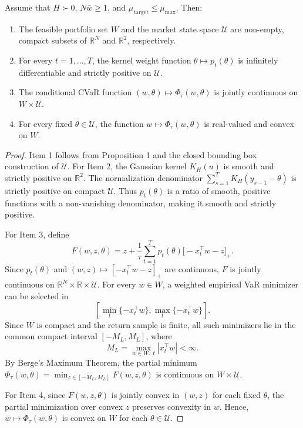 \documentclass[smallextended]{svjour3}
\begin{document}
\begin{proposition}
Assume that $H \succ 0$, $N\bar{w} \ge 1$, and $\mu_{\text{target}} \le \mu_{\max}$. Then:
\begin{enumerate}
    \item The feasible portfolio set $W$ and the market state space $\mathcal{U}$ are non-empty, compact subsets of $\mathbb{R}^N$ and $\mathbb{R}^2$, respectively.
    \item For every $t = 1, \dots, T$, the kernel weight function $\theta \mapsto p_t(\theta)$ is infinitely differentiable and strictly positive on $\mathcal{U}$.
    \item The conditional CVaR function $(w, \theta) \mapsto \Phi_\tau(w, \theta)$ is jointly continuous on $W \times \mathcal{U}$.
    \item For every fixed $\theta \in \mathcal{U}$, the function $w \mapsto \Phi_\tau(w, \theta)$ is real-valued and convex on $W$.
\end{enumerate}
\end{proposition}

\begin{proof}
Item 1 follows from Proposition 1 and the closed bounding box construction of $\mathcal{U}$. For Item 2, the Gaussian kernel $K_H(u)$ is smooth and strictly positive on $\mathbb{R}^2$. The normalization denominator $\sum_{s=1}^T K_H(y_{s-1} - \theta)$ is strictly positive on compact $\mathcal{U}$. Thus $p_t(\theta)$ is a ratio of smooth, positive functions with a non-vanishing denominator, making it smooth and strictly positive.

For Item 3, define
\begin{equation}
F(w,z,\theta) = z+\frac{1}{\tau}\sum_{t=1}^{T} p_t(\theta)\big[-x_t^\top w-z\big]_+.
\end{equation}
Since $p_t(\theta)$ and $(w,z)\mapsto[-x_t^\top w-z]_+$ are continuous, $F$ is jointly continuous on $\mathbb R^N\times\mathbb R\times\mathcal{U}$. For every $w\in W$, a weighted empirical VaR minimizer can be selected in
\begin{equation}
\left[\min_t\{-x_t^\top w\},\max_t\{-x_t^\top w\}\right].
\end{equation}
Since $W$ is compact and the return sample is finite, all such minimizers lie in the common compact interval $[-M_L,M_L]$, where
\begin{equation}
M_L=\max_{w\in W,\;t}|x_t^\top w|<\infty.
\end{equation}
By Berge's Maximum Theorem, the partial minimum $\Phi_\tau(w, \theta) = \min_{z \in [-M_L, M_L]} F(w, z, \theta)$ is continuous on $W \times \mathcal{U}$.

For Item 4, since $F(w, z, \theta)$ is jointly convex in $(w, z)$ for each fixed $\theta$, the partial minimization over convex $z$ preserves convexity in $w$. Hence, $w \mapsto \Phi_\tau(w, \theta)$ is convex on $W$ for each $\theta \in \mathcal{U}$.
\end{proof}
\end{document}
